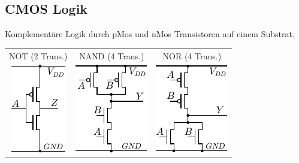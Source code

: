 \documentclass[fs, footer]{latex4ei}
\begin{document}
\begin{multicols*}{4}
{	\subsection{CMOS Logik}
	Komplementäre Logik durch pMos und nMos Transistoren auf einem Substrat.\\
	\begin{tabular}{ccc}
		NOT (2 Trans.) & NAND (4 Trans.) & NOR (4 Trans.)\\
		\includegraphics[scale = 0.9]{./img/mosfet_not.pdf} & \includegraphics[scale = 0.9]{./img/mosfet_nand.pdf} & \includegraphics[scale = 0.9]{./img/mosfet_nor.pdf} \\
	\end{tabular}\\
}









\newpage


\end{multicols*}
\end{document}
